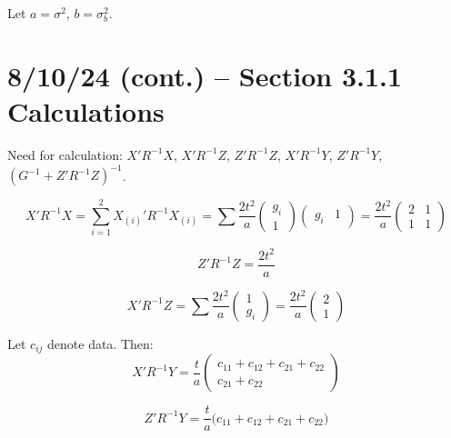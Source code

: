 \documentclass[11pt]{article}
\begin{document}
Let $a = \sigma^2$, \; $b = \sigma_b^2$.


\newpage
\section{8/10/24 (cont.) -- Section 3.1.1 Calculations}

Need for calculation:
$X'R^{-1}X$, \; $X'R^{-1}Z$, \; $Z'R^{-1}Z$, \;
$X'R^{-1}Y$, \; $Z'R^{-1}Y$, \;
$(G^{-1} + Z'R^{-1}Z)^{-1}$.

\begin{equation}
  X'R^{-1}X
  = \sum_{i=1}^{2} X_{(i)}' R^{-1} X_{(i)}
  = \sum \frac{2t^2}{a}
    \begin{pmatrix} g_i \\ 1 \end{pmatrix}
    \begin{pmatrix} g_i & 1 \end{pmatrix}
  = \frac{2t^2}{a}
    \begin{pmatrix} 2 & 1 \\ 1 & 1 \end{pmatrix}
\end{equation}

\begin{equation}
  Z'R^{-1}Z = \frac{2t^2}{a}
\end{equation}

\begin{equation}
  X'R^{-1}Z
  = \sum \frac{2t^2}{a}
    \begin{pmatrix} 1 \\ g_i \end{pmatrix}
  = \frac{2t^2}{a}
    \begin{pmatrix} 2 \\ 1 \end{pmatrix}
\end{equation}

Let $c_{ij}$ denote data. Then:
\begin{equation}
  X'R^{-1}Y
  = \frac{t}{a}
    \begin{pmatrix}
      c_{11} + c_{12} + c_{21} + c_{22} \\
      c_{21} + c_{22}
    \end{pmatrix}
\end{equation}

\begin{equation}
  Z'R^{-1}Y
  = \frac{t}{a}
    \bigl(c_{11} + c_{12} + c_{21} + c_{22}\bigr)
\end{equation}
\end{document}
